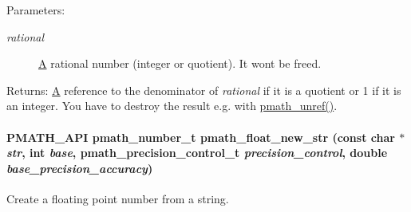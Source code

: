 \begin{Desc}
\item[Parameters:]
\begin{description}
\item[{\em rational}]\hyperlink{class_a}{A} rational number (integer or quotient). It wont be freed. \end{description}
\end{Desc}
\begin{Desc}
\item[Returns:]\hyperlink{class_a}{A} reference to the denominator of {\em rational\/} if it is a quotient or 1 if it is an integer. You have to destroy the result e.g. with \hyperlink{classpmath__t_54e905402c38940687033b87eb8c6c9f}{pmath\_\-unref()}. \end{Desc}
\hypertarget{group__numbers_g6c67d61f1a57084cc46e858a307ec461}{
\paragraph[{pmath\_\-float\_\-new\_\-str}]{\setlength{\rightskip}{0pt plus 5cm}PMATH\_\-API {\bf pmath\_\-number\_\-t} pmath\_\-float\_\-new\_\-str (const char $\ast$ {\em str}, \/  int {\em base}, \/  pmath\_\-precision\_\-control\_\-t {\em precision\_\-control}, \/  double {\em base\_\-precision\_\-accuracy})}\hfill}
\label{group__numbers_g6c67d61f1a57084cc46e858a307ec461}


Create a floating point number from a string. 

